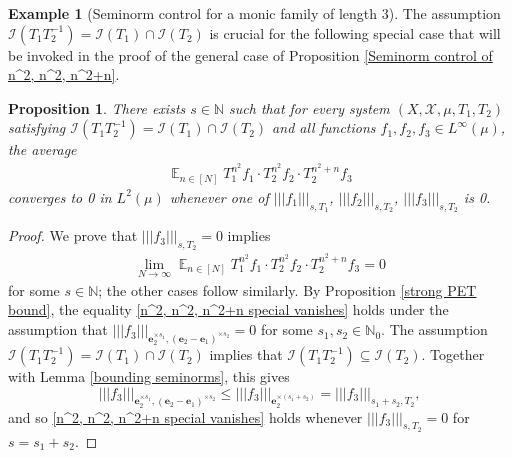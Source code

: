 \documentclass[11pt]{amsart}
\newtheorem{proposition}[lemma]{Proposition}
\theoremstyle{definition}
\newtheorem{example}{Example}
\newcommand{\N}{{\mathbb N}}
\newcommand{\CI}{{\mathcal I}}
\newcommand{\CX}{{\mathcal X}}
\newcommand{\be}{{\mathbf{e}}}
\newcommand{\nnorm}[1]{\lvert\!|\!| #1|\!|\!\rvert}
\newcommand{\inv}{^{-1}}
\DeclareMathOperator*{\E}{\mathbb{E}}
\begin{document}
\begin{example}[Seminorm control for a monic family of length 3]
The assumption $\CI(T_1 T_2^{-1})=\CI(T_1)\cap\CI(T_2)$ is crucial for the following special case that will be invoked in the proof of the general case of Proposition \ref{Seminorm control of n^2, n^2, n^2+n}.
\begin{proposition}\label{Smoothing of n^2, n^2, n^2+n special 1}
    There exists $s\in\N$ such that  for every system $(X, \CX, \mu, T_1, T_2)$ satisfying $\CI(T_1 T_2^{-1})=\CI(T_1)\cap\CI(T_2)$ and all functions $f_1, f_2, f_3\in L^\infty(\mu)$, the average
\begin{align}\label{n^2, n^2, n^2+n special 1}
    \E_{n\in[N]}T_1^{n^2} f_1 \cdot T_2^{n^2}f_2 \cdot T_2^{n^2+n}f_3
\end{align}
converges to 0 in $L^2(\mu)$ whenever one of $\nnorm{f_1}_{s, T_1}$, $\nnorm{f_2}_{s, T_2}$, $\nnorm{f_3}_{s, T_2}$ is 0.
\end{proposition}
\begin{proof}
We prove that $\nnorm{f_3}_{s, T_2} = 0$ implies
\begin{align}\label{n^2, n^2, n^2+n special vanishes}
    \lim_{N\to\infty}\E_{n\in[N]}T_1^{n^2} f_1 \cdot T_2^{n^2}f_2 \cdot T_2^{n^2+n}f_3    = 0
\end{align}
for some $s\in\N$; the other cases follow similarly. By Proposition \ref{strong PET bound}, the equality \eqref{n^2, n^2, n^2+n special vanishes} holds under the assumption that $\nnorm{f_3}_{\be_2^{\times s_1}, (\be_2 - \be_1)^{\times s_2}} = 0$ for some $s_1, s_2\in\N_0$. The assumption $\CI(T_1 T_2^{-1})=\CI(T_1)\cap\CI(T_2)$ implies that $\CI(T_1 T_2\inv)\subseteq\CI(T_2)$. Together with Lemma \ref{bounding seminorms}, this gives $$\nnorm{f_3}_{\be_2^{\times s_1}, (\be_2 - \be_1)^{\times s_2}}\leq \nnorm{f_3}_{\be_2^{\times (s_1+s_2)}} = \nnorm{f_3}_{s_1+s_2, T_2},$$ and so \eqref{n^2, n^2, n^2+n special vanishes} holds whenever $\nnorm{f_3}_{s, T_2} = 0$ for $s=s_1+s_2$.
\end{proof}


\end{example}
\end{document}
